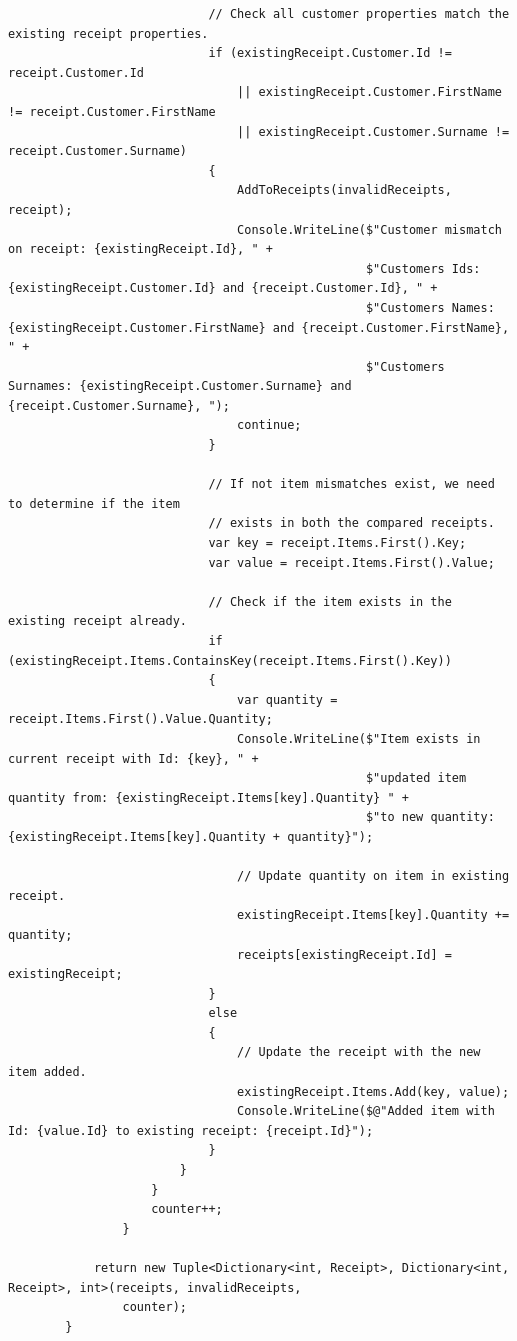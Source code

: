 \documentclass{article}
\begin{document}
\begin{lstlisting}
                            // Check all customer properties match the existing receipt properties.
                            if (existingReceipt.Customer.Id != receipt.Customer.Id
                                || existingReceipt.Customer.FirstName != receipt.Customer.FirstName
                                || existingReceipt.Customer.Surname != receipt.Customer.Surname)
                            {
                                AddToReceipts(invalidReceipts, receipt);
                                Console.WriteLine($"Customer mismatch on receipt: {existingReceipt.Id}, " +
                                                  $"Customers Ids: {existingReceipt.Customer.Id} and {receipt.Customer.Id}, " +
                                                  $"Customers Names: {existingReceipt.Customer.FirstName} and {receipt.Customer.FirstName}, " +
                                                  $"Customers Surnames: {existingReceipt.Customer.Surname} and {receipt.Customer.Surname}, ");
                                continue;
                            }

                            // If not item mismatches exist, we need to determine if the item 
                            // exists in both the compared receipts.
                            var key = receipt.Items.First().Key;
                            var value = receipt.Items.First().Value;

                            // Check if the item exists in the existing receipt already.
                            if (existingReceipt.Items.ContainsKey(receipt.Items.First().Key))
                            {
                                var quantity = receipt.Items.First().Value.Quantity;
                                Console.WriteLine($"Item exists in current receipt with Id: {key}, " +
                                                  $"updated item quantity from: {existingReceipt.Items[key].Quantity} " +
                                                  $"to new quantity: {existingReceipt.Items[key].Quantity + quantity}");

                                // Update quantity on item in existing receipt.
                                existingReceipt.Items[key].Quantity += quantity;
                                receipts[existingReceipt.Id] = existingReceipt;
                            }
                            else
                            {
                                // Update the receipt with the new item added.
                                existingReceipt.Items.Add(key, value);
                                Console.WriteLine($@"Added item with Id: {value.Id} to existing receipt: {receipt.Id}");
                            }
                        }
                    }
                    counter++;
                }

            return new Tuple<Dictionary<int, Receipt>, Dictionary<int, Receipt>, int>(receipts, invalidReceipts,
                counter);
        }
    \end{lstlisting}
\end{document}
